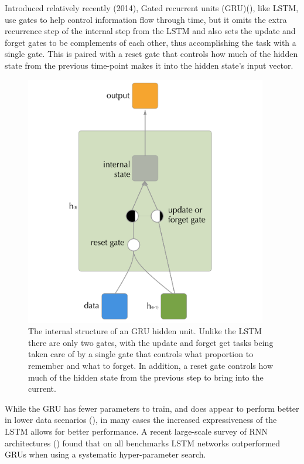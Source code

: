 \documentclass[]{book}
\theoremstyle{definition}
\theoremstyle{definition}
\theoremstyle{definition}
\theoremstyle{remark}
\begin{document}
Introduced relatively recently (2014), Gated recurrent units
(GRU)(\citet{gru_intro}), like LSTM, use gates to help control
information flow through time, but it omits the extra recurrence step of
the internal step from the LSTM and also sets the update and forget
gates to be complements of each other, thus accomplishing the task with
a single gate. This is paired with a reset gate that controls how much
of the hidden state from the previous time-point makes it into the
hidden state's input vector.

\begin{figure}
\includegraphics[width=400]{figures/gru_cell} \caption{The internal structure of an GRU hidden unit. Unlike the LSTM there are only two gates, with the update and forget get tasks being taken care of by a single gate that controls what proportion to remember and what to forget. In addition, a reset gate controls how much of the hidden state from the previous step to bring into the current.}\label{fig:grudiagram}
\end{figure}

While the GRU has fewer parameters to train, and does appear to perform
better in lower data scenarios (\citet{graves_rnn}), in many cases the
increased expressiveness of the LSTM allows for better performance. A
recent large-scale survey of RNN architectures (\citet{rnn_survey})
found that on all benchmarks LSTM networks outperformed GRUs when using
a systematic hyper-parameter search.
\end{document}
